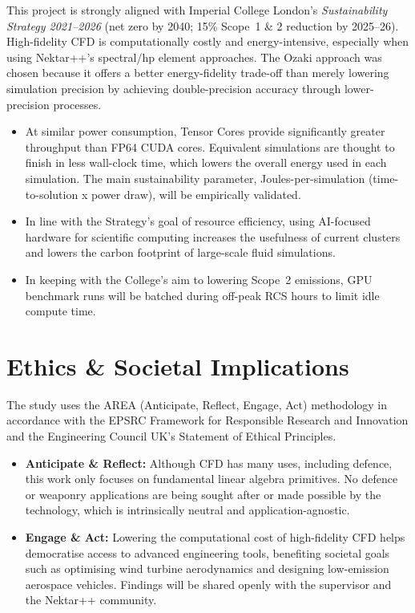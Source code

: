 \documentclass[10pt, a4paper]{article}
\begin{document}
This project is strongly aligned with Imperial College London's \textit{Sustainability Strategy 2021--2026} (net zero by 2040; 15\% Scope~1 \& 2 reduction by 2025--26).  High-fidelity CFD is computationally costly and energy-intensive, especially when using Nektar++'s spectral/hp element approaches. The Ozaki approach was chosen because it offers a better energy-fidelity trade-off than merely lowering simulation precision by achieving double-precision accuracy through lower-precision processes.
\begin{itemize}[leftmargin=*, label={\color{ImperialBlue}\textbullet}, nosep, topsep=0pt]
    \item At similar power consumption, Tensor Cores provide significantly greater throughput than FP64 CUDA cores. Equivalent simulations are thought to finish in less wall-clock time, which lowers the overall energy used in each simulation.  The main sustainability parameter, Joules-per-simulation (time-to-solution x power draw), will be empirically validated.
    \item In line with the Strategy's goal of resource efficiency, using AI-focused hardware for scientific computing increases the usefulness of current clusters and lowers the carbon footprint of large-scale fluid simulations.
    \item In keeping with the College's aim to lowering Scope~2 emissions, GPU benchmark runs will be batched during off-peak RCS hours to limit idle compute time.
\end{itemize}

\section*{Ethics \& Societal Implications}

The study uses the AREA (Anticipate, Reflect, Engage, Act) methodology in accordance with the EPSRC Framework for Responsible Research and Innovation and the Engineering Council UK's Statement of Ethical Principles.
\begin{itemize}[leftmargin=*, label={\color{ImperialBlue}\textbullet}, nosep, topsep=0pt]
    \item \textbf{Anticipate \& Reflect:} Although CFD has many uses, including defence, this work only focuses on fundamental linear algebra primitives. No defence or weaponry applications are being sought after or made possible by the technology, which is intrinsically neutral and application-agnostic.
    \item \textbf{Engage \& Act:} Lowering the computational cost of high-fidelity CFD helps democratise access to advanced engineering tools, benefiting societal goals such as optimising wind turbine aerodynamics and designing low-emission aerospace vehicles. Findings will be shared openly with the supervisor and the Nektar++ community.
\end{itemize}
\end{document}
